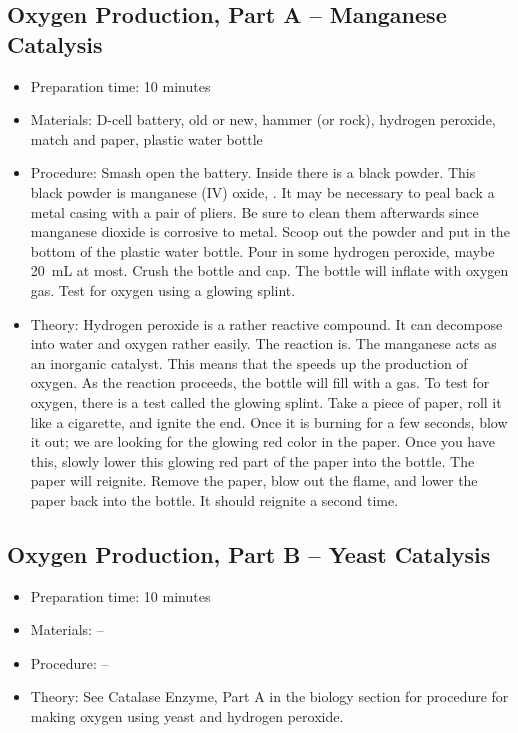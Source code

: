 \subsection{Oxygen Production, Part A -- Manganese Catalysis}
\begin{itemize}
\item{Preparation time: 10 minutes}
\item{Materials: D-cell battery, old or new, hammer (or rock), hydrogen peroxide, match and paper, plastic water bottle}
\item{Procedure: Smash open the battery. Inside there is a black powder. This black powder is manganese (IV) oxide, . It may be necessary to peal back a metal casing with a pair of pliers. Be sure to clean them afterwards since manganese dioxide is corrosive to metal. Scoop out the powder and put in the bottom of the plastic water bottle. Pour in some hydrogen peroxide, maybe 20~mL at most. Crush the bottle and cap. The bottle will inflate with oxygen gas. Test for oxygen using a glowing splint.}
\item{Theory: Hydrogen peroxide is a rather reactive compound. It can decompose into water and oxygen rather easily. The reaction is. The manganese acts as an inorganic catalyst. This means that the  speeds up the production of oxygen. As the reaction proceeds, the bottle will fill with a gas. To test for oxygen, there is a test called the glowing splint. Take a piece of paper, roll it like a cigarette, and ignite the end. Once it is burning for a few seconds, blow it out; we are looking for the glowing red color in the paper. Once you have this, slowly lower this glowing red part of the paper into the bottle. The paper will reignite. Remove the paper, blow out the flame, and lower the paper back into the bottle. It should reignite a second time.}
\end{itemize}

\subsection{Oxygen Production, Part B -- Yeast Catalysis}
\begin{itemize}
\item{Preparation time: 10 minutes}
\item{Materials: --}
\item{Procedure: --}
\item{Theory: See Catalase Enzyme, Part A in the biology section for procedure for making oxygen using yeast and hydrogen peroxide.}
\end{itemize}

